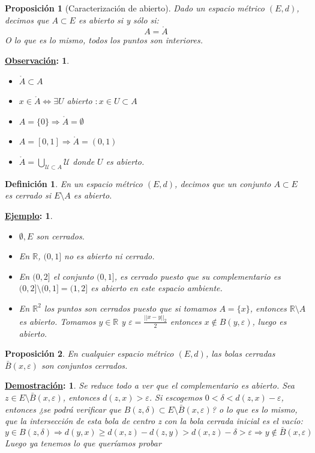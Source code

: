 \documentclass[10pt,a4paper,openright]{book}
\theoremstyle{break}
\newtheorem*{defi}{Definición}
\newtheorem*{prop}{Proposición}
\newtheorem*{demo}{\underline{Demostración}:}
\newtheorem*{obs}{\underline{Observación}:}
\newtheorem*{ej}{\underline{Ejemplo}:}
\begin{document}
\begin{prop}[Caracterización de abierto]
Dado un espacio métrico $(E,d)$, decimos que $A\subset E$ es abierto si y sólo si:
$$A = \mathring{A}$$
O lo que es lo mismo, todos los puntos son interiores.
\end{prop}

\begin{obs}
\begin{itemize}
\item $\mathring{A} \subset A$
\item $x \in \mathring{A} \Leftrightarrow \exists U$ abierto $: x \in U \subset A$
\item $A=\{0\}\Rightarrow \mathring{A} = \emptyset$
\item $A = [0,1]\Rightarrow\mathring{A} = (0,1)$
\item $\mathring{A} = \bigcup_{\mathcal{U} \subset A} \mathcal{U}$ donde $U$ es abierto.
\end{itemize}
\end{obs}

\begin{defi}
En un espacio métrico $(E,d)$, decimos que un conjunto $A\subset E$ es cerrado si $E\setminus{A}$ es abierto.
\end{defi}

\begin{ej}
\begin{itemize}
\item $\emptyset, E$ son cerrados.
\item En $\mathbb{R}$, $(0,1]$ no es abierto ni cerrado.
\item En $(0,2]$ el conjunto $(0,1]$, es cerrado puesto que su complementario es $(0,2]\setminus(0,1] = (1,2]$ es abierto en este espacio ambiente.
\item En $\mathbb{R}^{2}$ los puntos son cerrados puesto que si tomamos $A=\{x\}$, entonces $\mathbb{R}\setminus A$ es abierto. Tomamos $y\in \mathbb{R}$ y $\varepsilon = \frac{||x-y||_2}{2}$ entonces $x\notin B(y,\varepsilon)$, luego es abierto.
\end{itemize}
\end{ej}

\begin{prop}
En cualquier espacio métrico $(E,d)$, las bolas cerradas $\bar{B}(x,\varepsilon)$ son conjuntos cerrados.
\end{prop}

\begin{demo}
Se reduce todo a ver que el complementario es abierto. Sea $z\in E\setminus \bar{B}(x,\varepsilon)$, entonces $d(z,x) > \varepsilon$.
Si escogemos $0 < \delta < d(z,x) - \varepsilon$,  entonces ¿se podrá verificar que $B(z,\delta)\subset E\setminus \bar{B}(x,\varepsilon)$? o lo que es lo mismo, que la intersección de esta bola de centro z con la bola cerrada inicial es el vacío:
$$y \in B(z,\delta)\Rightarrow d(y,x)\geq d(x,z) - d(z,y)> d(x,z) - \delta >\varepsilon \Rightarrow y \notin \bar{B}(x,\varepsilon)$$
Luego ya tenemos lo que queríamos probar
\end{demo}
\end{document}
